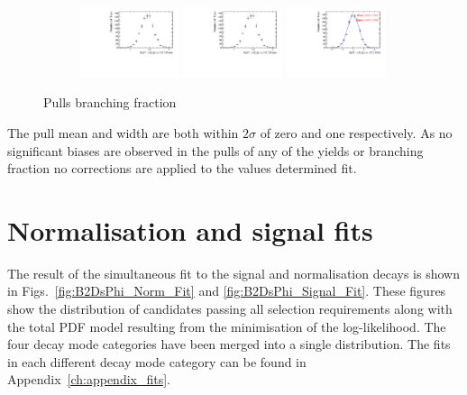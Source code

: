 \begin{figure}[!h]
   \centering
   \begin{subfigure}[t]{1.0\textwidth}
      \includegraphics[width=0.32\textwidth]{figs/B2DsPhi/Plots_DsKK_Error_Branching_fraction.pdf}
      \includegraphics[width=0.32\textwidth]{figs/B2DsPhi/Plots_DsKK_Error_Branching_fraction.pdf}
      \includegraphics[width=0.32\textwidth]{figs/B2DsPhi/Plots_DsKK_Pull_Branching_fraction.pdf}
   \end{subfigure}
   \caption{Pulls branching fraction}
   \label{fig:B2DsPhi_Pulls_signal}
\end{figure}
The pull mean and width are both within $2\sigma$ of zero and one respectively. 
As no significant biases are observed in the pulls of any of the yields or branching fraction no corrections are applied to the values determined fit.


\section{Normalisation and signal fits}

The result of the simultaneous fit to the signal and normalisation decays is shown in Figs.~\ref{fig:B2DsPhi_Norm_Fit} and \ref{fig:B2DsPhi_Signal_Fit}. These figures show the distribution of candidates passing all selection requirements along with the total PDF model resulting from the minimisation of the log-likelihood. The four \Dsp decay mode categories have been merged into a single distribution. The fits in each different \Ds decay mode category can be found in Appendix~\ref{ch:appendix_fits}.



